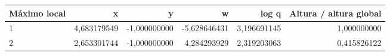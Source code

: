 \begin{tabular}{lrrrrr}
\toprule
Máximo local & x & y & w & log q & Altura / altura global \\
\midrule
1 & 4,683179549 & -1,000000000 & -5,628646431 & 3,196691145 & 1,000000000 \\
2 & 2,653301744 & -1,000000000 & 4,284293929 & 2,319203063 & 0,415826122 \\
\bottomrule
\end{tabular}
